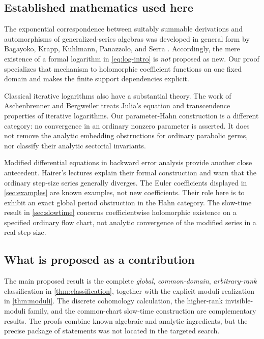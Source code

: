 \documentclass[11pt,a4paper]{article}
\numberwithin{equation}{section}
\theoremstyle{definition}
\theoremstyle{remark}
\begin{document}
\subsection{Established mathematics used here}

The exponential correspondence between suitably summable derivations and
automorphisms of generalized-series algebras was developed in general form
by Bagayoko, Krapp, Kuhlmann, Panazzolo, and Serra
\cite{bkkps}.  Accordingly, the mere existence of a formal logarithm in
\eqref{eq:log-intro} is \emph{not} proposed as new.  Our proof specializes
that mechanism to holomorphic coefficient functions on one fixed domain and
makes the finite support dependencies explicit.

Classical iterative logarithms also have a substantial theory.  The work of
Aschenbrenner and Bergweiler \cite{ab} treats Julia's equation and
transcendence properties of iterative logarithms.  Our parameter-Hahn
construction is a different category: no convergence in an ordinary
nonzero parameter is asserted.  It does not remove the analytic embedding
obstructions for ordinary parabolic germs, nor classify their analytic
sectorial invariants.

Modified differential equations in backward error analysis provide another
close antecedent.  Hairer's lectures \cite{hairer} explain their formal
construction and warn that the ordinary step-size series generally diverges.
The Euler coefficients displayed in \cref{sec:examples} are known examples,
not new coefficients.  Their role here is to exhibit an exact global period
obstruction in the Hahn category.  The slow-time result in
\cref{sec:slowtime} concerns coefficientwise holomorphic existence on a
specified ordinary flow chart, not analytic convergence of the modified
series in a real step size.

\subsection{What is proposed as a contribution}

The main proposed result is the complete \emph{global}, \emph{common-domain},
\emph{arbitrary-rank} classification in \cref{thm:classification}, together
with the explicit moduli realization in \cref{thm:moduli}.  The discrete
cohomology calculation, the higher-rank invisible-moduli family, and the
common-chart slow-time construction are complementary results.  The proofs
combine known algebraic and analytic ingredients, but the precise package
of statements was not located in the targeted search.
\end{document}
